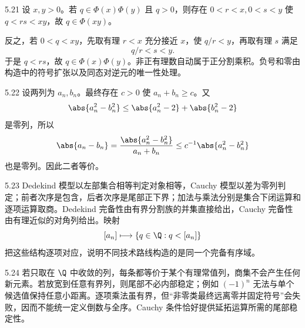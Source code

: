 \begin{solution}{5.21}
设 \(x,y>0\)。若 \(q\in\Phi(x)\Phi(y)\) 且 \(q>0\)，则存在 \(0<r<x,0<s<y\) 使 \(q<rs<xy\)，故 \(q\in\Phi(xy)\)。

反之，若 \(0<q<xy\)，先取有理 \(r<x\) 充分接近 \(x\)，使 \(q/r<y\)，再取有理 \(s\) 满足
\[
 q/r<s<y.
\]
于是 \(q<rs\)，故 \(q\in\Phi(x)\Phi(y)\)。非正有理数自动属于正分割乘积。负号和零由构造中的符号扩张以及同态对逆元的唯一性处理。
\end{solution}

\begin{solution}{5.22}
设两列为 \(a_n,b_n\)。最终存在 \(c>0\) 使 \(a_n+b_n\ge c\)。又
\[
 \abs{a_n^2-b_n^2}
 \le\abs{a_n^2-2}+\abs{b_n^2-2}
\]
是零列，所以
\[
 \abs{a_n-b_n}
 =\frac{\abs{a_n^2-b_n^2}}{a_n+b_n}
 \le c^{-1}\abs{a_n^2-b_n^2}
\]
也是零列。因此二者等价。
\end{solution}

\begin{solution}{5.23}
Dedekind 模型以左部集合相等判定对象相等，Cauchy 模型以差为零列判定；前者次序是包含，后者次序是尾部正下界；加法与乘法分别是集合下闭运算和逐项运算取商。Dedekind 完备性由有界分割族的并集直接给出，Cauchy 完备性由有理近似的对角列给出。映射
\[
 [a_n]\longmapsto\{q\in\Q:q<[a_n]\}
\]
把这些结构逐项对应，说明不同技术路线构造的是同一个完备有序域。
\end{solution}

\begin{solution}{5.24}
若只取在 \(\Q\) 中收敛的列，每条都等价于某个有理常值列，商集不会产生任何新元素。若放宽到任意有界列，则尾部不必内部稳定；例如 \((-1)^n\) 无法与单个候选值保持任意小距离。逐项乘法虽有界，但“非零类最终远离零并固定符号”会失败，因而不能统一定义倒数与全序。Cauchy 条件恰好提供延拓运算所需的尾部稳定性。
\end{solution}
